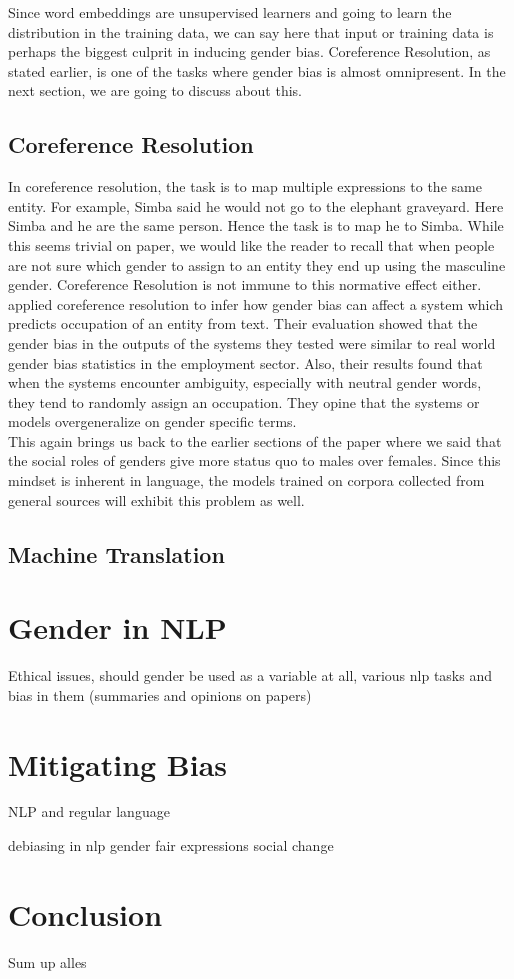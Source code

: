 \documentclass{article}
\begin{document}
\noindent
Since word embeddings are unsupervised learners and going to learn the distribution in the training data, we can say here that input or training data is perhaps the biggest culprit in inducing gender bias. Coreference Resolution, as stated earlier, is one of the tasks where gender bias is almost omnipresent. In the next section, we are going to discuss about this. 


\subsection*{Coreference Resolution}
In coreference resolution, the task is to map multiple expressions to the same entity. For example, Simba said he would not go to the elephant graveyard. Here Simba and he are the same person. Hence the task is to map he to Simba. While this seems trivial on paper, we would like the reader to recall that when people are not sure which gender to assign to an entity they end up using the masculine gender. Coreference Resolution is not immune to this normative effect either. \\

\noindent
\cite{rudinger-etal-2018-gender} applied coreference resolution to infer how gender bias can affect a system which predicts occupation of an entity from text. Their evaluation showed that the gender bias in the outputs of the systems they tested were similar to real world gender bias statistics in the employment sector. Also, their results found that when the systems encounter ambiguity, especially with neutral gender words, they tend to randomly assign an occupation. They opine that the systems or models overgeneralize on gender specific terms. \\ 

\noindent
This again brings us back to the earlier sections of the paper where we said that the social roles of genders give more status quo to males over females. Since this mindset is inherent in language, the models trained on corpora collected from general sources will exhibit this problem as well. 

\subsection*{Machine Translation}


\section{Gender in NLP}
Ethical issues, should gender be used as a variable at all, various nlp tasks and bias in them (summaries and opinions on papers)

\section{Mitigating Bias}
NLP and regular language

debiasing in nlp
gender fair expressions
social change

\section{Conclusion}
Sum up alles

\clearpage


\end{document}
